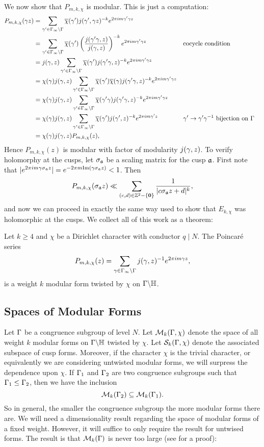       We now show that $P_{m,k,\chi}$ is modular. This is just a computation:
      \begin{align*}
        P_{m,k,\chi}(\gamma z) &= \sum_{\gamma' \in \Gamma_{\infty}\backslash\Gamma}\overline{\chi}(\gamma')j(\gamma',\gamma z)^{-k}e^{2\pi im\gamma'\gamma z} \\
        &= \sum_{\gamma' \in \Gamma_{\infty}\backslash\Gamma}\overline{\chi}(\gamma')\left(\frac{j(\gamma'\gamma,z)}{j(\gamma,z)}\right)^{-k}e^{2\pi im\gamma'\gamma z} && \text{cocycle condition} \\
        &= j(\gamma,z)\sum_{\gamma' \in \Gamma_{\infty}\backslash\Gamma}\overline{\chi}(\gamma')j(\gamma'\gamma,z)^{-k}e^{2\pi im\gamma'\gamma z} \\
        &= \chi(\gamma)j(\gamma,z)\sum_{\gamma' \in \Gamma_{\infty}\backslash\Gamma}\overline{\chi}(\gamma')\overline{\chi}(\gamma)j(\gamma'\gamma,z)^{-k}e^{2\pi im\gamma'\gamma z} \\
        &= \chi(\gamma)j(\gamma,z)\sum_{\gamma' \in \Gamma_{\infty}\backslash\Gamma}\overline{\chi}(\gamma'\gamma)j(\gamma'\gamma,z)^{-k}e^{2\pi im\gamma'\gamma z} \\
        &= \chi(\gamma)j(\gamma,z)\sum_{\gamma' \in \Gamma_{\infty}\backslash\Gamma}\overline{\chi}(\gamma')j(\gamma',z)^{-k}e^{2\pi im\gamma'z} && \text{$\gamma' \to \gamma'\gamma^{-1}$ bijection on $\Gamma$} \\
        &= \chi(\gamma)j(\gamma,z)P_{m,k,\chi}(z),
      \end{align*}
      Hence $P_{m,k,\chi}(z)$ is modular with factor of modularity $j(\gamma,z)$. To verify holomorphy at the cusps, let $\sigma_{\mathfrak{a}}$ be a scaling matrix for the cusp $\mathfrak{a}$. First note that $|e^{2\pi im\gamma\sigma_{\mathfrak{a}}z}| = e^{-2\pi m\mathrm{Im}(\gamma\sigma_{\mathfrak{a}}z)} < 1$. Then
      \[
        P_{m,k,\chi}(\sigma_{\mathfrak{a}}z) \ll \sum_{(c,d) \in \mathbb{Z}^{2}-\{\mathbf{0}\}}\frac{1}{|c\sigma_{\mathfrak{a}}z+d|^{k}},
      \]
      and now we can proceed in exactly the same way used to show that $E_{k,\chi}$ was holomorphic at the cusps. We collect all of this work as a theorem:

      \begin{theorem}
        Let $k \ge 4$ and $\chi$ be a Dirichlet character with conductor $q \mid N$. The Poincar\'e series
        \[
          P_{m,k,\chi}(z) = \sum_{\gamma \in \Gamma_{\infty}\backslash\Gamma}j(\gamma,z)^{-1}e^{2\pi im\gamma z},
        \]
        is a weight $k$ modular form twisted by $\chi$ on $\Gamma\backslash\mathbb{H}$.
      \end{theorem}
    \subsection*{Spaces of Modular Forms}
      Let $\Gamma$ be a congruence subgroup of level $N$. Let $\mathcal{M}_{k}(\Gamma,\chi)$ denote the space of all weight $k$ modular forms on $\Gamma\backslash\mathbb{H}$ twisted by $\chi$. Let $\mathcal{S}_{k}(\Gamma,\chi)$ denote the associated subspace of cusp forms. Moreover, if the character $\chi$ is the trivial character, or equivalently we are considering untwisted modular forms, we will surpress the dependence upon $\chi$. If $\Gamma_{1}$ and $\Gamma_{2}$ are two congruence subgroups such that $\Gamma_{1} \le \Gamma_{2}$, then we have the inclusion
      \[
        \mathcal{M}_{k}(\Gamma_{2}) \subseteq \mathcal{M}_{k}(\Gamma_{1}).
      \]
      So in general, the smaller the congruence subgroup the more modular forms there are. We will need a dimensionality result regarding the space of modular forms of a fixed weight. However, it will suffice to only require the result for untwised forms. The result is that $\mathcal{M}_{k}(\Gamma)$ is never too large (see \cite{diamond2005first} for a proof):

